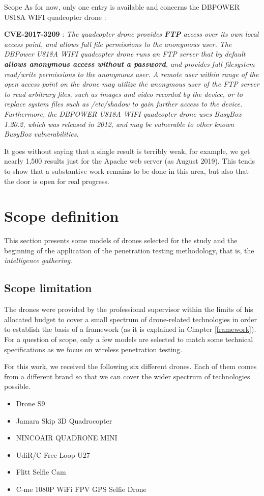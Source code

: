 \begin{chaptercover}{Scope}
As for now, only one entry is available and concerns the DBPOWER U818A WIFI quadcopter drone :
\begin{indentbox}{1cm}
  \textbf{CVE-2017-3209} : \textit{The quadcopter drone provides \textbf{FTP} access over its own local access point, and allows full file permissions to the anonymous user. The DBPower U818A WIFI quadcopter drone runs an FTP server that by default \textbf{allows anonymous access without a password}, and provides full filesystem read/write permissions to the anonymous user. A remote user within range of the open access point on the drone may utilize the anonymous user of the FTP server to read arbitrary files, such as images and video recorded by the device, or to replace system files such as /etc/shadow to gain further access to the device. Furthermore, the DBPOWER U818A WIFI quadcopter drone uses BusyBox 1.20.2, which was released in 2012, and may be vulnerable to other known BusyBox vulnerabilities.}
\end{indentbox}

It goes without saying that a single result is terribly weak, for example, we get nearly 1,500 results just for the Apache web server (as August 2019). This tends to show that a substantive work remains to be done in this area, but also that the door is open for real progress.

\section{Scope definition}

This section presents some models of drones selected for the study and the beginning of the application of the penetration testing methodology, that is, the \textit{intelligence gathering}.

\subsection{Scope limitation}

The drones were provided by the professional supervisor within the limits of his allocated budget to cover a small spectrum of drone-related technologies in order to establish the basis of a framework (as it is explained in Chapter \ref{framework}). For a question of scope, only a few models are selected to match some technical specifications as we focus on wireless penetration testing.

For this work, we received the following six different drones. Each of them comes from a different brand so that we can cover the wider spectrum of technologies possible.
\begin{itemize}[itemsep=.1cm,topsep=.1cm]
  \item Drone S9
  \item Jamara Skip 3D Quadrocopter
  \item NINCOAIR QUADRONE MINI
  \item UdiR/C Free Loop U27 
  \item Flitt Selfie Cam
  \item C-me 1080P WiFi FPV GPS Selfie Drone
\end{itemize}


\end{chaptercover}
